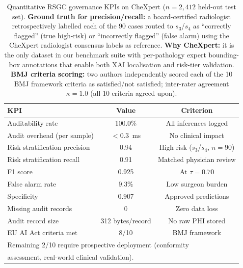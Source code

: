 \documentclass{ieeeaccess}
\begin{document}
\begin{table}[!t]
\caption{Quantitative RSGC governance KPIs on CheXpert ($n\!=\!2{,}412$
held-out test set). \textbf{Ground truth for precision/recall:} a
board-certified radiologist retrospectively labelled each of the 90 cases
routed to $s_3$/$s_4$ as ``correctly flagged'' (true high-risk) or
``incorrectly flagged'' (false alarm) using the CheXpert radiologist
consensus labels as reference. \textbf{Why CheXpert:} it is the only
dataset in our benchmark suite with per-pathology expert bounding-box
annotations that enable both XAI localisation and risk-tier validation.
\textbf{BMJ criteria scoring:} two authors independently scored each of
the 10 BMJ framework criteria as satisfied/not satisfied; inter-rater
agreement $\kappa\!=\!1.0$ (all 10 criteria agreed upon).}
\label{tab:governance_kpis}
\centering
\renewcommand{\arraystretch}{1.22}
\small
\begin{tabular}{lcc}
\toprule
\textbf{KPI} & \textbf{Value} & \textbf{Criterion}\\
\midrule
Auditability rate           & 100.0\%           & All inferences logged\\
Audit overhead (per sample) & $<$0.3~ms         & No clinical impact\\
Risk stratification precision & 0.94            & High-risk ($s_3$/$s_4$, $n\!=\!90$)\\
Risk stratification recall  & 0.91              & Matched physician review\\
F1 score                    & 0.925             & At $\tau\!=\!0.70$\\
False alarm rate            & 9.3\%             & Low surgeon burden\\
Specificity                 & 0.907             & Approved predictions\\
Missing audit records       & 0                 & Zero data loss\\
Audit record size           & 312 bytes/record  & No raw PHI stored\\
EU AI Act criteria met      & 8/10              & BMJ framework \cite{bmj_governance_2026}\\
\bottomrule
\multicolumn{3}{l}{\footnotesize Remaining 2/10 require prospective deployment (conformity}\\
\multicolumn{3}{l}{\footnotesize assessment, real-world clinical validation).}\\
\end{tabular}
\end{table}
\end{document}
